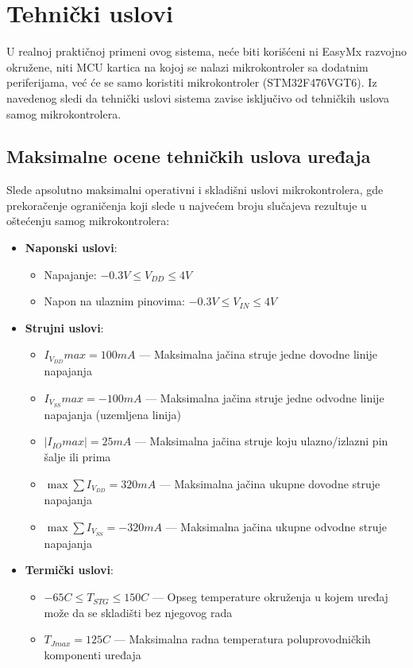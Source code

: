 \documentclass[a4paper, 12pt, oneside, titlepage]{article}
\begin{document}
    \section{Tehnički uslovi}
    U realnoj praktičnoj primeni ovog sistema, neće biti korišćeni ni EasyMx razvojno okružene, niti MCU kartica na kojoj se nalazi mikrokontroler sa dodatnim periferijama, već će se samo
    koristiti mikrokontroler (STM32F476VGT6). Iz navedenog sledi da tehnički uslovi sistema zavise isključivo od tehničkih uslova samog mikrokontrolera.
    
      \subsection{Maksimalne ocene tehničkih uslova uređaja}
      Slede apsolutno maksimalni operativni i skladišni uslovi mikrokontrolera, gde prekoračenje ograničenja koji slede u najvećem broju slučajeva rezultuje u oštećenju samog mikrokontrolera:
      \begin{itemize}
	\item \textbf{Naponski uslovi}:
	\begin{itemize}
	  \item Napajanje: $-0.3 V \le V_{DD} \le 4 V$
	  \item Napon na ulaznim pinovima: $-0.3 V \le V_{IN} \le 4 V$
	\end{itemize}
	\item \textbf{Strujni uslovi}:
	\begin{itemize}
	\item $I_{V_{DD}}max = 100 mA$ --- Maksimalna jačina struje jedne dovodne linije napajanja
	\item $I_{V_{SS}}max = -100 mA$ --- Maksimalna jačina struje jedne odvodne linije napajanja (uzemljena linija)
	\item $|I_{IO}max| = 25mA$ --- Maksimalna jačina struje koju ulazno/izlazni pin šalje ili prima
	\item $\max \sum I_{V_{DD}} = 320 mA$ --- Maksimalna jačina ukupne dovodne struje napajanja
	\item $\max \sum I_{V_{SS}} = -320 mA$ --- Maksimalna jačina ukupne odvodne struje napajanja
	\end{itemize}
	\item \textbf{Termički uslovi}:
	\begin{itemize}
	  \item $-65 $\textdegree$C \le T_{STG} \le 150 $\textdegree$C$ --- Opseg temperature okruženja u kojem uređaj može da se skladišti bez njegovog rada
	  \item $T_{Jmax} = 125 $\textdegree$C$ --- Maksimalna radna temperatura poluprovodničkih komponenti uređaja
	\end{itemize}
      \end{itemize}
      
\end{document}
